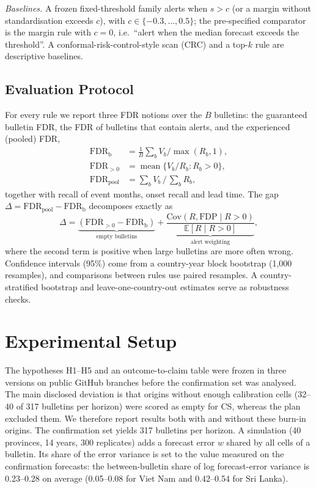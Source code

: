 \documentclass[conference]{IEEEtran}
\newcommand{\FDRb}{\mathrm{FDR}_{\mathrm{b}}}
\newcommand{\FDRp}{\mathrm{FDR}_{\mathrm{pool}}}
\begin{document}
\textit{Baselines.} A frozen fixed-threshold family alerts when $s>c$ (or a margin without standardisation exceeds $c$), with $c\in\{-0.3,\dots,0.5\}$; the pre-specified comparator is the margin rule with $c=0$, i.e.\ ``alert when the median forecast exceeds the threshold''. A conformal-risk-control-style scan (CRC) \cite{angelopoulos2024crc} and a top-$k$ rule are descriptive baselines.

\subsection{Evaluation Protocol}
For every rule we report three FDR notions over the $B$ bulletins: the guaranteed bulletin FDR, the FDR of bulletins that contain alerts, and the experienced (pooled) FDR,
\begin{align}
\FDRb &= \tfrac{1}{B}\textstyle\sum_b V_b/\max(R_b,1),\\
\mathrm{FDR}_{>0} &= \operatorname{mean}\{V_b/R_b : R_b>0\},\\
\FDRp &= \textstyle\sum_b V_b \,/\, \sum_b R_b,
\end{align}
together with recall of event months, onset recall and lead time. The gap $\Delta=\FDRp-\FDRb$ decomposes exactly as
\begin{equation}
\Delta=\underbrace{(\mathrm{FDR}_{>0}-\FDRb)}_{\text{empty bulletins}}+\underbrace{\frac{\mathrm{Cov}(R,\mathrm{FDP}\mid R>0)}{\mathbb{E}[R\mid R>0]}}_{\text{alert weighting}},
\end{equation}
where the second term is positive when large bulletins are more often wrong. Confidence intervals (95\%) come from a country-year block bootstrap (1{,}000 resamples), and comparisons between rules use paired resamples. A country-stratified bootstrap and leave-one-country-out estimates serve as robustness checks.

\section{Experimental Setup}

The hypotheses H1--H5 and an outcome-to-claim table were frozen in three versions on public GitHub branches before the confirmation set was analysed. The main disclosed deviation is that origins without enough calibration cells (32--40 of 317 bulletins per horizon) were scored as empty for CS, whereas the plan excluded them. We therefore report results both with and without these burn-in origins. The confirmation set yields 317 bulletins per horizon. A simulation (40 provinces, 14 years, 300 replicates) adds a forecast error $w$ shared by all cells of a bulletin. Its share of the error variance is set to the value measured on the confirmation forecasts: the between-bulletin share of log forecast-error variance is 0.23--0.28 on average (0.05--0.08 for Viet Nam and 0.42--0.54 for Sri Lanka).
\end{document}
